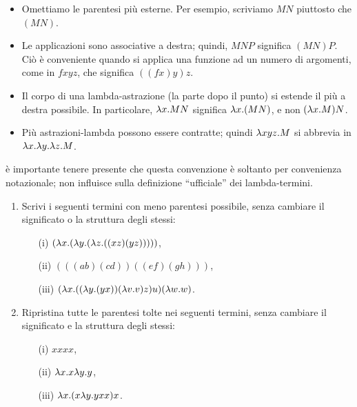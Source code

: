 \documentclass{article}
\begin{document}
\begin{convention}
  \begin{itemize}
  \item Omettiamo le parentesi pi\`u esterne. Per esempio, scriviamo $MN$
    piuttosto che $(MN)$.
  \item Le applicazioni sono associative a destra; quindi, $MNP$ significa
    $(MN)P$. Ci\`o \`e conveniente quando si applica una funzione ad un
    numero di argomenti, come in $fxyz$, che significa $((fx)y)z$. 
  \item Il corpo di una lambda-astrazione (la parte dopo il punto)
  si estende il pi\`u a destra possibile. In particolare, $\lambda
    x.MN$ significa $\lambda x.(MN)$, e non $(\lambda x.M)N$. 
  \item Pi\`u astrazioni-lambda possono essere contratte; quindi $\lambda
    xyz.M$ si abbrevia in $\lambda x.\lambda y.\lambda z.M$.
  \end{itemize}
\end{convention}  

\`e importante tenere presente che questa convenzione \`e soltanto 
per convenienza notazionale; non influisce sulla definizione 
``ufficiale'' dei lambda-termini.

\begin{exercise}
  \begin{enumerate}\alphalabels
  \item Scrivi i seguenti termini con meno parentesi possibile,
  senza cambiare il significato o la struttura degli stessi:
    \begin{enumerate}
    \item[(i)] $(\lambda x.(\lambda y.(\lambda z.((xz)(yz)))))$, 
    \item[(ii)] $(((ab)(cd))((ef)(gh)))$, 
    \item[(iii)] $(\lambda x.((\lambda y.(yx))(\lambda v.v)z)u)(\lambda w.w)$.
    \end{enumerate}
  \item Ripristina tutte le parentesi tolte nei seguenti termini,
  senza cambiare il significato e la struttura degli stessi:
    \begin{enumerate}
    \item[(i)] $xxxx$, 
    \item[(ii)] $\lambda x.x\lambda y.y$, 
    \item[(iii)] $\lambda x.(x\lambda y.yxx)x$.
    \end{enumerate}
  \end{enumerate}
\end{exercise}
\end{document}
